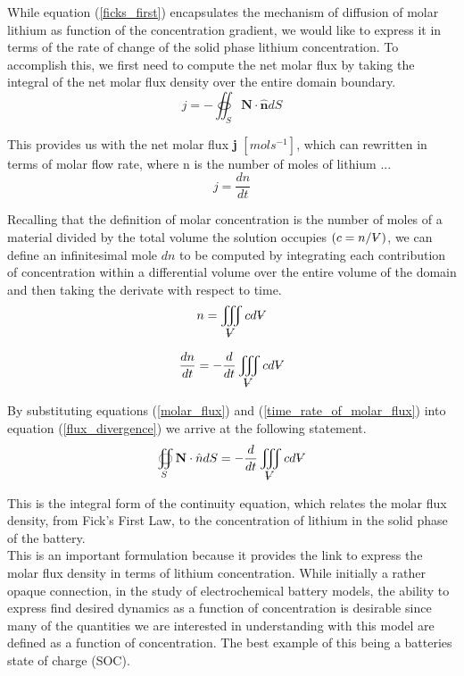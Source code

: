 \documentclass[lettersize,journal]{IEEEtran}
\newcommand{\volume}{{\ooalign{\hfil$V$\hfil\cr\kern0.08em--\hfil\cr}}}
\begin{document}
While equation (\ref{ficks_first}) encapsulates the mechanism of diffusion of molar lithium as function of the concentration gradient, we would like to express it in terms of the rate of change of the solid phase lithium concentration. To accomplish this, we first need to compute the net molar flux by taking the integral of the net molar flux density over the entire domain boundary.
\begin{equation}\label{flux_divergence}
  j = -\oiint_{S} \textbf{N} \cdot \hat{\textbf{n}}dS
\end{equation}

This provides us with the net molar flux \textbf{j} $ [mol s^{-1}]$, which can rewritten in terms of molar flow rate, where n is the number of moles of lithium ...
\begin{equation}\label{molar_flux}
    j = \frac{dn}{dt}
\end{equation}

Recalling that the definition of molar concentration is the number of moles of a material divided by the total volume the solution occupies $\left( c = n / \volume \right)$, we can define an infinitesimal mole $dn$ to be computed by integrating each contribution of concentration within a differential volume over the entire volume of the domain and then taking the derivate with respect to time.
\begin{equation}
    n = \iiint_{\volume} cd{\volume}
\end{equation}

\begin{equation}\label{time_rate_of_molar_flux}
  \frac{dn}{dt} = -\frac{d}{dt} \iiint_{\volume} cd{\volume}
\end{equation}

\noindent By substituting equations (\ref{molar_flux}) and (\ref{time_rate_of_molar_flux}) into equation (\ref{flux_divergence}) we arrive at the following statement.
\begin{equation}\label{COM_s_int_form}
  \oiint_S \textbf{N} \cdot \hat{n}dS = -\frac{d}{dt} \iiint_{\volume} c d{\volume}
\end{equation}

This is the integral form of the continuity equation, which relates the molar flux density, from Fick's First Law, to the concentration of lithium in the solid phase of the battery. \\

\noindent This is an important formulation because it provides the link to express the molar flux density in terms of lithium concentration. While initially a rather opaque connection, in the study of electrochemical battery models, the ability to express find desired dynamics as a function of concentration is desirable since many of the quantities we are interested in understanding with this model are defined as a function of concentration. The best example of this being a batteries state of charge (SOC). \\
\end{document}
